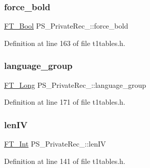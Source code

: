 \mbox{\label{struct_p_s___private_rec___a40e62a278e48f47a0f204bd9fa5c883f}} 
\subsubsection{\texorpdfstring{force\_bold}{force\_bold}}
{\footnotesize\ttfamily \mbox{\hyperlink{fttypes_8h_a1a832a256bb5a7e6e884afaa1a07f3ae}{F\+T\+\_\+\+Bool}} P\+S\+\_\+\+Private\+Rec\+\_\+\+::force\+\_\+bold}



Definition at line 163 of file t1tables.\+h.

\mbox{\label{struct_p_s___private_rec___afc2a7f950a174577ebfc062bb1598f5c}} 
\subsubsection{\texorpdfstring{language\_group}{language\_group}}
{\footnotesize\ttfamily \mbox{\hyperlink{fttypes_8h_a7fa72a1f0e79fb1860c5965789024d6f}{F\+T\+\_\+\+Long}} P\+S\+\_\+\+Private\+Rec\+\_\+\+::language\+\_\+group}



Definition at line 171 of file t1tables.\+h.

\mbox{\label{struct_p_s___private_rec___a796ebb92d96f0297ae584a911768db8b}} 
\subsubsection{\texorpdfstring{lenIV}{lenIV}}
{\footnotesize\ttfamily \mbox{\hyperlink{fttypes_8h_af90e5fb0d07e21be9fe6faa33f02484c}{F\+T\+\_\+\+Int}} P\+S\+\_\+\+Private\+Rec\+\_\+\+::len\+IV}



Definition at line 141 of file t1tables.\+h.

\mbox{\label{struct_p_s___private_rec___af8c829e03c424b1f12b2c9cd4041a868}} 
